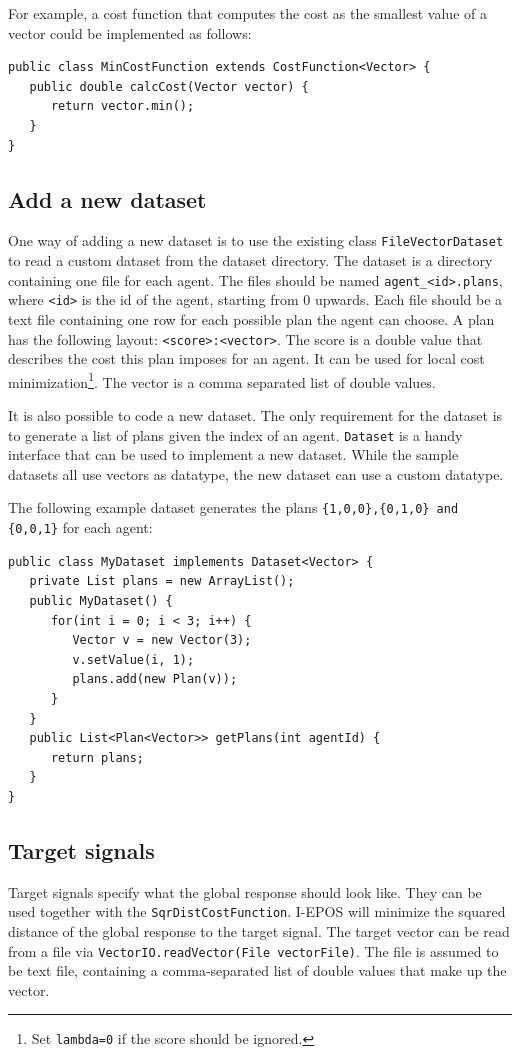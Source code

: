 \documentclass[11pt]{article} %
\newcommand{\code}{\texttt}
\begin{document}
For example, a cost function that computes the cost as the smallest value of a vector could be implemented as follows:
\begin{verbatim}
public class MinCostFunction extends CostFunction<Vector> {
   public double calcCost(Vector vector) {
      return vector.min();
   }
}
\end{verbatim}

\subsection{Add a new dataset} \label{sec:new_dataset}
One way of adding a new dataset is to use the existing class \code{FileVectorDataset} to read a custom dataset from the dataset directory. The dataset is a directory containing one file for each agent. The files should be named \code{agent\_<id>.plans}, where \code{<id>} is the id of the agent, starting from 0 upwards.
Each file should be a text file containing one row for each possible plan the agent can choose. A plan has the following layout: \code{<score>:<vector>}. The score is a double value that describes the cost this plan imposes for an agent. It can be used for local cost minimization\footnote{Set \code{lambda=0} if the score should be ignored.}. The vector is a comma separated list of double values.

It is also possible to code a new dataset. The only requirement for the dataset is to generate a list of plans given the index of an agent. \code{Dataset} is a handy interface that can be used to implement a new dataset. While the sample datasets all use vectors as datatype, the new dataset can use a custom datatype.

The following example dataset generates the plans \code{\{1,0,0\},\{0,1,0\} and \{0,0,1\}} for each agent:
\begin{verbatim}
public class MyDataset implements Dataset<Vector> {
   private List plans = new ArrayList();
   public MyDataset() {
      for(int i = 0; i < 3; i++) {
         Vector v = new Vector(3);
         v.setValue(i, 1);
         plans.add(new Plan(v));
      }
   }
   public List<Plan<Vector>> getPlans(int agentId) {
      return plans;
   }
}
\end{verbatim}

\subsection{Target signals} \label{sec:read_vec}
Target signals specify what the global response should look like. They can be used together with the \code{SqrDistCostFunction}. I-EPOS will minimize the squared distance of the global response
to the target signal.
The target vector can be read from a file via \code{VectorIO.readVector(File vectorFile)}. The file is assumed to be text file, containing a comma-separated list of double values that make up the vector.
\end{document}
